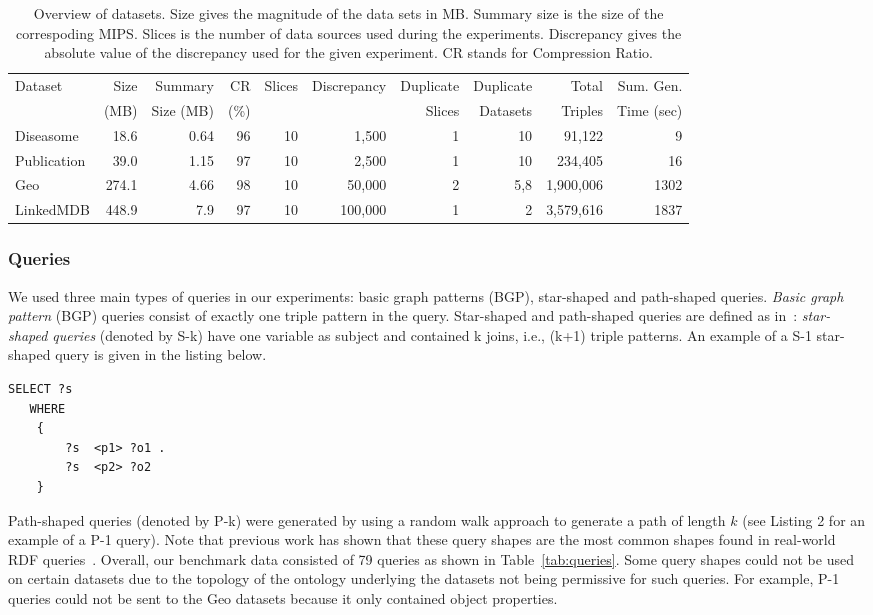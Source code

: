 \documentclass{sig-alternate}  %
\begin{document}
\begin{table}
\centering
\begin{tabular}{lrrrrrrrrr}
\hline
Dataset & Size  & Summary 	& CR   & Slices & Discrepancy & Duplicate  & Duplicate & Total 	& Sum. Gen. \\
				& (MB) 	& Size (MB) & (\%) &	  		 &  					 & Slices 		& Datasets 	& Triples & Time (sec)\\
\hline
Diseasome 			& 18.6 	& 0.64 	& 96 & 10 & 1,500 		& 1 & 10 			& 91,122 & 9\\
Publication 						& 39.0	& 1.15 	& 97 & 10 & 2,500 		& 1 & 10 			& 234,405 & 16\\
Geo 						& 274.1 & 4.66 	& 98 & 10 & 50,000 	& 2 & 5,8				& 1,900,006 & 1302\\
LinkedMDB 			& 448.9 & 7.9 	& 97 & 10 & 100,000 	& 1 & 2 			& 3,579,616 & 1837\\
\hline
\end{tabular}
\caption{Overview of datasets. Size gives the magnitude of the data sets in MB. Summary size is the size of the correspoding MIPS. Slices is the number of data sources used during the experiments. Discrepancy gives the absolute value of the discrepancy used for the given experiment. CR stands for Compression Ratio.}
\label{tab:datasets}
\end{table}


\subsubsection{Queries}
We used three main types of queries in our experiments: basic graph patterns (BGP), star-shaped and path-shaped queries.
\emph{Basic graph pattern} (BGP) queries consist of exactly one triple pattern in the query.
Star-shaped and path-shaped queries are defined as in~\cite{key-5}: \emph{star-shaped queries} (denoted by S-k) have one variable as subject and contained k joins, i.e., (k+1) triple patterns.
An example of a S-1 star-shaped query is given in the listing below.
\begin{lstlisting}[caption = {A P-1 query example},frame = single,language=SPARQL]
 SELECT ?s 
   WHERE
    {
        ?s  <p1> ?o1 .
        ?s  <p2> ?o2
    }
\end{lstlisting}
Path-shaped queries (denoted by P-k) were generated by using a random walk approach to generate a path of length $k$ (see Listing 2 for an example of a P-1 query). 
Note that previous work has shown that these query shapes are the most common shapes found in real-world RDF queries~\cite{key-35}.
Overall, our benchmark data consisted of 79 queries as shown in Table~\ref{tab:queries}.
Some query shapes could not be used on certain datasets due to the topology of the ontology underlying the datasets not being permissive for such queries. 
For example, P-1 queries could not be sent to the Geo datasets because it only contained object properties.
\end{document}
